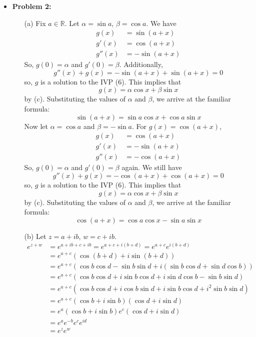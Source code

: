\documentclass[12pt]{amsart}
\theoremstyle{definition}
\theoremstyle{remark}
\begin{document}
\begin{itemize}
\item {\bf{Problem 2:}}

\begin{itemize}
\item[(a)] Fix $a\in \mathbb{R}$. Let $\alpha=\sin a$, $\beta=\cos a$. We have \begin{align*}
  g(x)&= \sin(a+x)\\
  g'(x)&= \cos(a+x)\\
  g''(x)&= -\sin(a+x)
  \end{align*}
  So, $g(0)=\alpha$ and $g'(0)=\beta$. Additionally, $$g''(x)+g(x)=-\sin(a+x)+\sin(a+x)=0$$so, $g$ is a solution to the IVP (6). This implies that $$g(x)=\alpha\cos x+\beta\sin x$$by (c). Substituting the values of $\alpha$ and $\beta$, we arrive at the familiar formula: $$\sin(a+x)=\sin a \cos x+\cos a \sin x$$
  Now let $\alpha=\cos a$ and $\beta=-\sin a$. For $g(x)=\cos(a+x)$, \begin{align*}
  g(x)&= \cos(a+x)\\
  g'(x)&= -\sin(a+x)\\
  g''(x)&= -\cos(a+x)
  \end{align*}So, $g(0)=\alpha$ and $g'(0)=\beta$ again. We still have $$g''(x)+g(x)=-\cos(a+x)+\cos(a+x)=0$$so, $g$ is a solution to the IVP (6). This implies that $$g(x)=\alpha\cos x+\beta\sin x$$by (c). Substituting the values of $\alpha$ and $\beta$, we arrive at the familiar formula: $$\cos(a+x)=\cos a\cos x-\sin a\sin x$$

\vspace{0.1 cm}
\item[(b)]Let $z=a+ib$, $w=c+ib$.\begin{align*}
  e^{z+w}&= e^{a+ib+c+ib}=e^{a+c+i(b+d)}=e^{a+c}e^{i(b+d)}\\
  &= e^{a+c}(\cos(b+d)+i\sin(b+d))\\
  &= e^{a+c}(\cos b\cos d-\sin b\sin d+i(\sin b\cos d+\sin d\cos b))\\
  &= e^{a+c}(\cos b\cos d+i\sin b\cos d+i\sin d\cos b-\sin b\sin d)\\
  &= e^{a+c}(\cos b\cos d+i\cos b\sin d+i\sin b\cos d+i^{2}\sin b\sin d)\\
  &= e^{a+c}(\cos b+i\sin b)(\cos d+i\sin d)\\
  &= e^{a}(\cos b+i\sin b)e^{c}(\cos d+i\sin d)\\
  &= e^{a}e^{-b}e^{c}e^{id}\\
  &= e^{z}e^{w}
  \end{align*}

\end{itemize}


\end{itemize}
\end{document}
